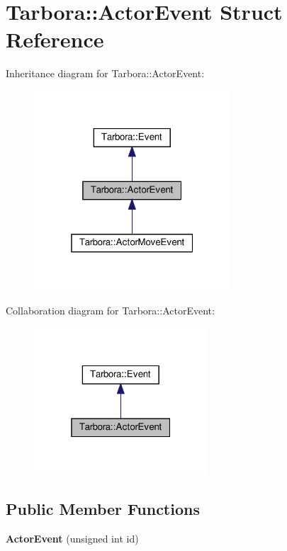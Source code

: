 \hypertarget{structTarbora_1_1ActorEvent}{}\section{Tarbora\+:\+:Actor\+Event Struct Reference}
\label{structTarbora_1_1ActorEvent}


Inheritance diagram for Tarbora\+:\+:Actor\+Event\+:\nopagebreak
\begin{figure}[H]
\begin{center}
\leavevmode
\includegraphics[width=208pt]{structTarbora_1_1ActorEvent__inherit__graph}
\end{center}
\end{figure}


Collaboration diagram for Tarbora\+:\+:Actor\+Event\+:\nopagebreak
\begin{figure}[H]
\begin{center}
\leavevmode
\includegraphics[width=184pt]{structTarbora_1_1ActorEvent__coll__graph}
\end{center}
\end{figure}
\subsection*{Public Member Functions}
\begin{DoxyCompactItemize}
\item 
\mbox{\label{structTarbora_1_1ActorEvent_a62d6692eb63a0935c1bf6f5ffdc91818}} 
{\bfseries Actor\+Event} (unsigned int id)
\end{DoxyCompactItemize}
